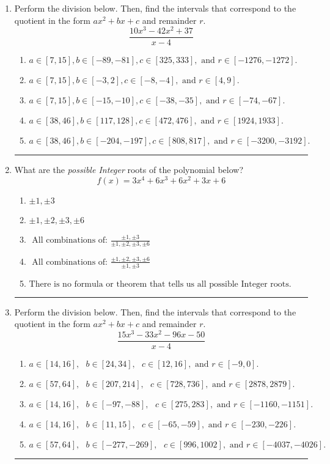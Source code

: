 \documentclass[14pt]{extbook}
\newcommand{\litem}[1]{\item#1\hspace*{-1cm}\rule{\textwidth}{0.4pt}}
\begin{document}
\begin{enumerate}
\litem{
Perform the division below. Then, find the intervals that correspond to the quotient in the form $ax^2+bx+c$ and remainder $r$.\[ \frac{10x^{3} -42 x^{2} + 37}{x -4} \]\begin{enumerate}[label=\Alph*.]
\item \( a \in [7, 15], b \in [-89, -81], c \in [325, 333], \text{ and } r \in [-1276, -1272]. \)
\item \( a \in [7, 15], b \in [-3, 2], c \in [-8, -4], \text{ and } r \in [4, 9]. \)
\item \( a \in [7, 15], b \in [-15, -10], c \in [-38, -35], \text{ and } r \in [-74, -67]. \)
\item \( a \in [38, 46], b \in [117, 128], c \in [472, 476], \text{ and } r \in [1924, 1933]. \)
\item \( a \in [38, 46], b \in [-204, -197], c \in [808, 817], \text{ and } r \in [-3200, -3192]. \)

\end{enumerate} }
\litem{
What are the \textit{possible Integer} roots of the polynomial below?\[ f(x) = 3x^{4} +6 x^{3} +6 x^{2} +3 x + 6 \]\begin{enumerate}[label=\Alph*.]
\item \( \pm 1,\pm 3 \)
\item \( \pm 1,\pm 2,\pm 3,\pm 6 \)
\item \( \text{ All combinations of: }\frac{\pm 1,\pm 3}{\pm 1,\pm 2,\pm 3,\pm 6} \)
\item \( \text{ All combinations of: }\frac{\pm 1,\pm 2,\pm 3,\pm 6}{\pm 1,\pm 3} \)
\item \( \text{There is no formula or theorem that tells us all possible Integer roots.} \)

\end{enumerate} }
\litem{
Perform the division below. Then, find the intervals that correspond to the quotient in the form $ax^2+bx+c$ and remainder $r$.\[ \frac{15x^{3} -33 x^{2} -96 x -50}{x -4} \]\begin{enumerate}[label=\Alph*.]
\item \( a \in [14, 16], \text{   } b \in [24, 34], \text{   } c \in [12, 16], \text{   and   } r \in [-9, 0]. \)
\item \( a \in [57, 64], \text{   } b \in [207, 214], \text{   } c \in [728, 736], \text{   and   } r \in [2878, 2879]. \)
\item \( a \in [14, 16], \text{   } b \in [-97, -88], \text{   } c \in [275, 283], \text{   and   } r \in [-1160, -1151]. \)
\item \( a \in [14, 16], \text{   } b \in [11, 15], \text{   } c \in [-65, -59], \text{   and   } r \in [-230, -226]. \)
\item \( a \in [57, 64], \text{   } b \in [-277, -269], \text{   } c \in [996, 1002], \text{   and   } r \in [-4037, -4026]. \)


\end{enumerate}}
\end{enumerate}
\end{document}
